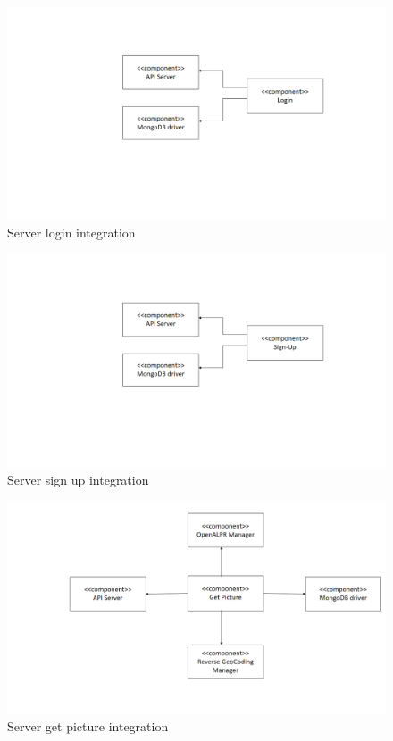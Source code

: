 \begin{figure}[H]
\centering
\includegraphics[width=\textwidth]{Images/ServerLoginIntegration.png}
\caption{\label{fig:ServerLoginIntegration} Server login integration}
\end{figure}

\begin{figure}[H]
\centering
\includegraphics[width=\textwidth]{Images/ServerSignUPIntegration.png}
\caption{\label{fig:ServerSignUPIntegration}Server sign up integration}
\end{figure}

\begin{figure}[H]
\centering
\includegraphics[width=\textwidth]{Images/ServerGetPicIntegration.png}
\caption{\label{fig:ServerGetPicIntegration} Server get picture integration}
\end{figure}

